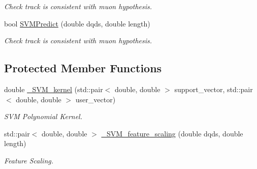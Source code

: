 \begin{DoxyCompactItemize}
\begin{DoxyCompactList}\small\item\em Check track is consistent with muon hypothesis. \end{DoxyCompactList}\item 
\hypertarget{classubana_1_1MuonCandidateFinder_a7139d4b040678249e402111d6adcc03c}{bool \hyperlink{classubana_1_1MuonCandidateFinder_a7139d4b040678249e402111d6adcc03c}{S\-V\-M\-Predict} (double dqds, double length)}\label{classubana_1_1MuonCandidateFinder_a7139d4b040678249e402111d6adcc03c}

\begin{DoxyCompactList}\small\item\em Check track is consistent with muon hypothesis. \end{DoxyCompactList}\end{DoxyCompactItemize}
\subsection*{Protected Member Functions}
\begin{DoxyCompactItemize}
\item 
\hypertarget{classubana_1_1MuonCandidateFinder_a62077bd56d0005c80113d1da9ef9c48e}{double \hyperlink{classubana_1_1MuonCandidateFinder_a62077bd56d0005c80113d1da9ef9c48e}{\-\_\-\-S\-V\-M\-\_\-kernel} (std\-::pair$<$ double, double $>$ support\-\_\-vector, std\-::pair$<$ double, double $>$ user\-\_\-vector)}\label{classubana_1_1MuonCandidateFinder_a62077bd56d0005c80113d1da9ef9c48e}

\begin{DoxyCompactList}\small\item\em S\-V\-M Polynomial Kernel. \end{DoxyCompactList}\item 
\hypertarget{classubana_1_1MuonCandidateFinder_a535c37ad2b554fe540f596a0b389ec32}{std\-::pair$<$ double, double $>$ \hyperlink{classubana_1_1MuonCandidateFinder_a535c37ad2b554fe540f596a0b389ec32}{\-\_\-\-S\-V\-M\-\_\-feature\-\_\-scaling} (double dqds, double length)}\label{classubana_1_1MuonCandidateFinder_a535c37ad2b554fe540f596a0b389ec32}

\begin{DoxyCompactList}\small\item\em Feature Scaling. \end{DoxyCompactList}\end{DoxyCompactItemize}

